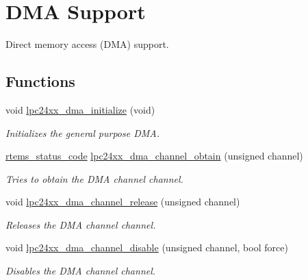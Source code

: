 \hypertarget{group__lpc24xx__dma}{}\section{D\+MA Support}
\label{group__lpc24xx__dma}


Direct memory access (D\+MA) support.  


\subsection*{Functions}
\begin{DoxyCompactItemize}
\item 
\mbox{\label{group__lpc24xx__dma_gabf4a36e44f073c52f9d2d590760e7a0f}} 
void \mbox{\hyperlink{group__lpc24xx__dma_gabf4a36e44f073c52f9d2d590760e7a0f}{lpc24xx\+\_\+dma\+\_\+initialize}} (void)
\begin{DoxyCompactList}\small\item\em Initializes the general purpose D\+MA. \end{DoxyCompactList}\item 
\mbox{\hyperlink{group__ClassicStatus_ga545d41846817eaba6143d52ee4d9e9fe}{rtems\+\_\+status\+\_\+code}} \mbox{\hyperlink{group__lpc24xx__dma_ga13026efa639048237c1406051d5e8507}{lpc24xx\+\_\+dma\+\_\+channel\+\_\+obtain}} (unsigned channel)
\begin{DoxyCompactList}\small\item\em Tries to obtain the D\+MA channel {\itshape channel}. \end{DoxyCompactList}\item 
void \mbox{\hyperlink{group__lpc24xx__dma_gad8fec9f6ee30a7cfbe8f1c47fd855510}{lpc24xx\+\_\+dma\+\_\+channel\+\_\+release}} (unsigned channel)
\begin{DoxyCompactList}\small\item\em Releases the D\+MA channel {\itshape channel}. \end{DoxyCompactList}\item 
void \mbox{\hyperlink{group__lpc24xx__dma_gad05876855d5c4234f5ee01b55be3f0d1}{lpc24xx\+\_\+dma\+\_\+channel\+\_\+disable}} (unsigned channel, bool force)
\begin{DoxyCompactList}\small\item\em Disables the D\+MA channel {\itshape channel}. \end{DoxyCompactList}\item 
\mbox{\label{group__lpc24xx__dma_gaa50b48196e4b4481c8ad9277550d8ae2}} 

\end{DoxyCompactItemize}
